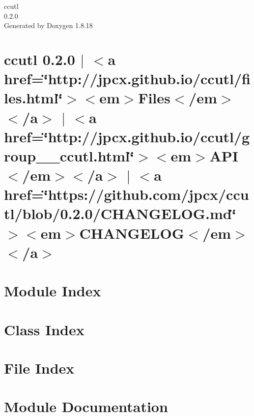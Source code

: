 \let\mypdfximage\pdfximage\def\pdfximage{\immediate\mypdfximage}\documentclass[twoside]{book}
\newcommand{\+}{\discretionary{\mbox{\scriptsize$\hookleftarrow$}}{}{}}
\newcommand{\clearemptydoublepage}{%
  \newpage{\pagestyle{empty}\cleardoublepage}%
}
\begin{document}
\hypersetup{pageanchor=false,
             bookmarksnumbered=true,
             pdfencoding=unicode
            }
\begin{titlepage}
\vspace*{7cm}
\begin{center}%
{\Large ccutl \\[1ex]\large 0.\+2.\+0 }\\
\vspace*{1cm}
{\large Generated by Doxygen 1.8.18}\\
\end{center}
\end{titlepage}
\clearemptydoublepage
{}
\tableofcontents
\clearemptydoublepage
{}
\hypersetup{pageanchor=true}

\chapter{ccutl 0.2.0 $\vert$ $<$a href=\char`\"{}http\+://jpcx.\+github.\+io/ccutl/files.\+html\char`\"{}$>$$<$em$>$Files$<$/em$>$$<$/a$>$ $\vert$ $<$a href=\char`\"{}http\+://jpcx.\+github.\+io/ccutl/group\+\_\+\+\_\+ccutl.\+html\char`\"{}$>$$<$em$>$A\+PI$<$/em$>$$<$/a$>$ $\vert$ $<$a href=\char`\"{}https\+://github.\+com/jpcx/ccutl/blob/0.\+2.\+0/\+C\+H\+A\+N\+G\+E\+L\+O\+G.\+md\char`\"{}$>$$<$em$>$C\+H\+A\+N\+G\+E\+L\+OG$<$/em$>$$<$/a$>$}
\label{index}\hypertarget{index}{}
\chapter{Module Index}

\chapter{Class Index}

\chapter{File Index}

\chapter{Module Documentation}



\end{document}
